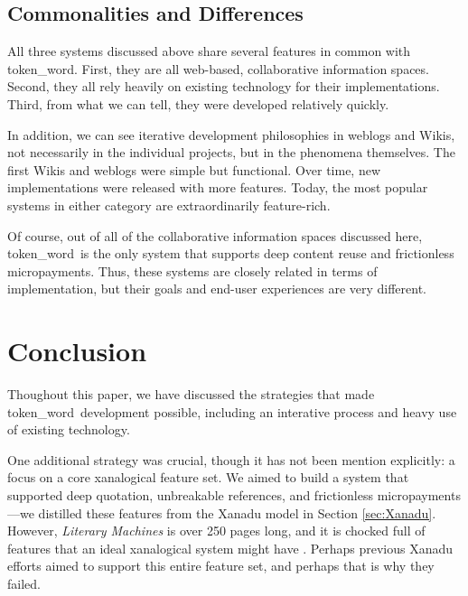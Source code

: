 \documentclass{acm_proc_article-sp}
\newcommand{\tw}{token\_word}
\begin{document}
\subsection{Commonalities and Differences}
All three systems discussed above share several features in common with \tw.
First, they are all web-based, collaborative information spaces.
Second, they all rely heavily on existing technology for their implementations.
Third, from what we can tell, they were developed relatively quickly.

In addition, we can see iterative development philosophies in weblogs and Wikis, not necessarily in the individual projects, but in the phenomena themselves.
The first Wikis and weblogs were simple but functional.
Over time, new implementations were released with more features.
Today, the most popular systems in either category are extraordinarily feature-rich.

Of course, out of all of the collaborative information spaces discussed here, \tw \  is the only system that supports deep content reuse and frictionless micropayments.
Thus, these systems are closely related in terms of implementation, but their goals and end-user experiences are very different. 




\section{Conclusion}
Thoughout this paper, we have discussed the strategies that made \tw \  development possible, including an interative process and heavy use of existing technology.

One additional strategy was crucial, though it has not been mention explicitly:  a focus on a core xanalogical feature set.
We aimed to build a system that supported deep quotation, unbreakable references, and frictionless micropayments---we distilled these features from the Xanadu model in Section \ref{sec:Xanadu}.
However, {\it Literary Machines} is over 250 pages long, and it is chocked full of features that an ideal xanalogical system might have \cite{NelsonLiteraryMachines}.
Perhaps previous Xanadu efforts aimed to support this entire feature set, and perhaps that is why they failed.
\end{document}
